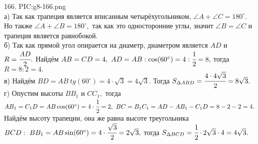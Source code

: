 166. {{PIC:g8-166.png}}\\
а) Так как трапеция является вписанным четырёхугольником, $\angle A+\angle C=180^\circ.$ Но также $\angle A +\angle B=180^\circ,$ так как это односторонние углы, значит $\angle B=\angle C$ и трапеция является равнобокой.\\
б) Так как прямой угол опирается на диаметр, диаметром является $AD$ и $R=\cfrac{AD}{2}.$ Найдём $AB=CD=4,\ AD=AB:\cos(60^\circ)=4:\cfrac{1}{2}=8,$ тогда $R=8:2=4.$\\
в) Найдём $BD=AB\ tg(60^\circ)=4\cdot \sqrt{3}=4\sqrt{3}.$ Тогда $S_{\Delta ABD}=\cfrac{4\cdot4\sqrt{3}}{2}=8\sqrt{3}.$\\
г) Опустим высоты $BB_1$ и $CC_1,$ тогда $AB_1=C_1D=AB\cos(60^\circ)=4\cdot\cfrac{1}{2}=2,\ BC=B_1C_1=AD-AB_1-C_1D=8-2-2=4.$ Найдём высоту трапеции, она же равна высоте треугольника $BCD:\ BB_1=AB\sin(60^\circ)=4\cdot\cfrac{\sqrt{3}}{2}=2\sqrt{3},$ тогда $S_{\Delta BCD}=\cfrac{1}{2}\cdot2\sqrt{3}\cdot4=4\sqrt{3}.$\\
